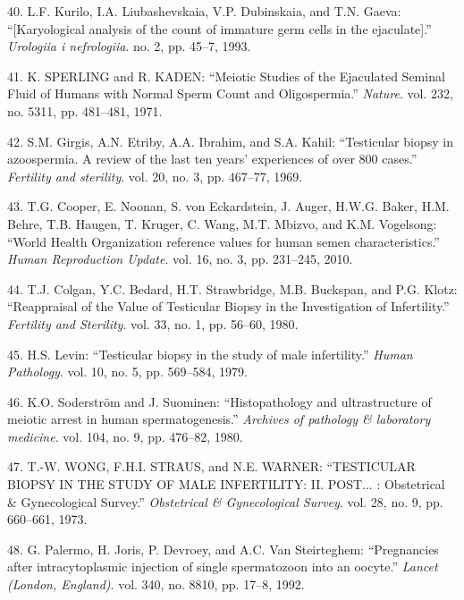 \documentclass[12pt,a4paper,twoside]{ugathesis}
\theoremstyle{definition}
\theoremstyle{definition}
\theoremstyle{definition}
\theoremstyle{remark}
\begin{document}
\hypertarget{ref-Kurilo}{}
40. L.F. Kurilo, I.A. Liubashevskaia, V.P. Dubinskaia, and T.N. Gaeva:
``{[}Karyological analysis of the count of immature germ cells in the
ejaculate{]}.'' \emph{Urologiia i nefrologiia}. no. 2, pp. 45--7, 1993.

\hypertarget{ref-SPERLING1971}{}
41. K. SPERLING and R. KADEN: ``Meiotic Studies of the Ejaculated
Seminal Fluid of Humans with Normal Sperm Count and Oligospermia.''
\emph{Nature}. vol. 232, no. 5311, pp. 481--481, 1971.

\hypertarget{ref-Girgis}{}
42. S.M. Girgis, A.N. Etriby, A.A. Ibrahim, and S.A. Kahil: ``Testicular
biopsy in azoospermia. A review of the last ten years' experiences of
over 800 cases.'' \emph{Fertility and sterility}. vol. 20, no. 3, pp.
467--77, 1969.

\hypertarget{ref-Cooper2010}{}
43. T.G. Cooper, E. Noonan, S. von Eckardstein, J. Auger, H.W.G. Baker,
H.M. Behre, T.B. Haugen, T. Kruger, C. Wang, M.T. Mbizvo, and K.M.
Vogelsong: ``World Health Organization reference values for human semen
characteristics.'' \emph{Human Reproduction Update}. vol. 16, no. 3, pp.
231--245, 2010.

\hypertarget{ref-Colgan1980}{}
44. T.J. Colgan, Y.C. Bedard, H.T. Strawbridge, M.B. Buckspan, and P.G.
Klotz: ``Reappraisal of the Value of Testicular Biopsy in the
Investigation of Infertility.'' \emph{Fertility and Sterility}. vol. 33,
no. 1, pp. 56--60, 1980.

\hypertarget{ref-Levin1979}{}
45. H.S. Levin: ``Testicular biopsy in the study of male infertility.''
\emph{Human Pathology}. vol. 10, no. 5, pp. 569--584, 1979.

\hypertarget{ref-Soderstrom1980}{}
46. K.O. Soderström and J. Suominen: ``Histopathology and ultrastructure
of meiotic arrest in human spermatogenesis.'' \emph{Archives of
pathology \& laboratory medicine}. vol. 104, no. 9, pp. 476--82, 1980.

\hypertarget{ref-WONG1973}{}
47. T.-W. WONG, F.H.I. STRAUS, and N.E. WARNER: ``TESTICULAR BIOPSY IN
THE STUDY OF MALE INFERTILITY: II. POST... : Obstetrical \&
Gynecological Survey.'' \emph{Obstetrical \& Gynecological Survey}. vol.
28, no. 9, pp. 660--661, 1973.

\hypertarget{ref-Palermo1992}{}
48. G. Palermo, H. Joris, P. Devroey, and A.C. Van Steirteghem:
``Pregnancies after intracytoplasmic injection of single spermatozoon
into an oocyte.'' \emph{Lancet (London, England)}. vol. 340, no. 8810,
pp. 17--8, 1992.
\end{document}
